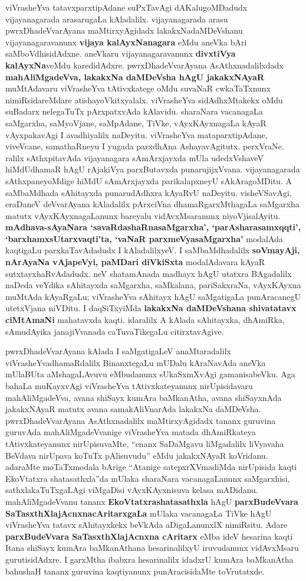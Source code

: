 viVrasheYva tatavxparxtipAdane suPxTavAgi dAKalugoMDadudx vijayanagarada arasarugaLa kAladalilx. vijayanagarada arasu pwrxDha\-deVvarAyana maMtirxyAgidadx lakakxNadaMDeVshanu vijayanagaravanunx \textbf{vijaya kalAyxNanagara} eMdu aneVka bAri saMboVdhisidAdxne. aneVkaru vijayanagaravanunx \textbf{divxtiVya kalAyxNa}veMdu karedidAdxre. pwrxDhadeVvarAyana AsAthxnadalilxdadx \textbf{mahAliMgadeVva, lakakxNa daMDeVsha hAgU jakakxNAyaR} muMtAdavaru viVrasheYva tAtivxkatege oMdu suvaNaR cwkaTaTxnunx nimiRsidareMdare atishayoVkitxyalalx. viVrasheYva sidAdhxMtakekx oMdu suBadarx nelegaTuTx pArxpatxvAda kAlavidu. sharaNara vacanagaLa saMgarxha, saMyoVjane, saMpAdane, TiVke, vAyxKAyxnagaLa kAyaR vAyxpakavAgi I avadhiyalilx naDeyitu. viVrasheYva mataparxtipAdane, viveVcane, samathaRneyu I yugada parxdhAna AshayavAgitutx. perxVraNe.  ralilx sAthxpitavAda vijayanagara sAmArxjayxda mUla udedxVshaveV hiMdUdhamaR hAgU rAjakiVya parxButavxda punarujijxVvana. vijayanagarada sAthxpaneyoMdige hiMdU sAmArxjayxda parikalapxneyU sAkAragoMDitu. A saMbaMdhada sAhitayxda punarudAdhxra kAyaRvU naDeyitu. visheVSavAgi, eraDaneV deVvarAyana kAladalilx pArxciVna dhamaRgarxMthagaLa saMgarxha matutx vAyxKAyxnagaLanunx bareyalu vidAvxMsaranunx niyoVjisalAyitu. \textbf{mAdhava-sAyaNara `savaRdashaRnasaMgarxha', `parAsharasamxqqti', `barxhamxsUtarxvaqti'ta, `vaNaR parxmeVyasaMgarxha'} modalAda kaqtigaLu parxkaTavAdadudx I kAladalilxyeV. I saMbaMdhadalilx \textbf{soVmayAji, nArAyaNa vAjapeVyi, paMDari diVkiSxta} modalAdavara kAyaR sutxtayxhaRvAdadudx. neV shatamAnada madhayx hAgU utatxra BAgadalilx naDeda veYdika sAhitayxda saMgarxha, saMkalana, pariSakxraNa, vAyxKAyxna muMtAda kAyaRgaLu; viVrasheYva sAhitayx hAgU saMgatigaLa punAracanegU utetxVjana niVDitu. I daqSiTxyiMda \textbf{lakakxNa daMDeVshana shivatatavx ciMtAmaNi} mahatavxda kaqti. idaralilx A kAlada sAhitayxka, dhAmiRka, sAmudAyika janajiVvanada caTuvaTikegaLu citirxtavAgive. 

pwrxDhadeVvarAyana kAlada I saMgatigaLeV anaMtaradalilx viVrasheYvadhamaRdalilx BinanxtegaLu mUDalu kAraNavAda aneVka mUlaBUta aMshagaLAvuvu eMbudanunx sUkaSxmXvAgi gamanisabeVku. Aga bahaLa muKayxvAgi viVrasheYva tAtivxkateyanunx nirUpisidavaru mahAliMgadeVva, avana shiSayx kumAra baMkanAtha, avana shiSayxnAda jakakxNAyaR matutx avana samakAliVnarAda lakakxNa \hbox{daMDeVsha}. pwrxDhadeVvarAyana AsAthxnadalilx maMtirxyAgidadx tananx guruvina guruvAda mahAliMgadeVvanige viVrasheYva matada dhAmiRkateya tAtivxkateyanunx nirUpisuvaMte, ``enanx SaDaMgavu liMgadalilx liVyavaha BeVdava nirUpava koTuTx pAlisuvudu'' eMdu jakakxNAyaR koVridanu. adaraMte moTaTxmodala bArige ``Atanige satepxrXVmadiMda nirUpisida kaqti EkoVtatxra shatasathxla''da mUlaka sharaNara vacanagaLanunx saMgarxhisi, sathxlakaTuTxgaLAgi viMgaDisi vAyxKAyxnisuva kelasa mADidanu. mahAliMgadeVvanu tananx \textbf{EkoVtatxrashatasathxla} hAgU \textbf{parxBudeVvara SaTasxthXlajAcnxnacAritarxgaLa} mUlaka vacanagaLa TiVke hAgU viVrasheYva tatavx sAhitayxkekx beVkAda aDigaLanunxlX nimiRsitu. Adare \textbf{parxBudeVvara SaTasxthXlajAcnxna cAritarx} eMba ideV hesarina kaqti Itana shiSayx kumAra baMkanAthana hesarinalilxyU iruvudanunx vidAvxMsaru gurutisidAdxre. I garxMtha ibabxra hesarinalilx idadxrU kumAra baMkanAtha bahushaH tananx guruvina kaqtiyanunx punAracisidaMte toVrutatxde.

